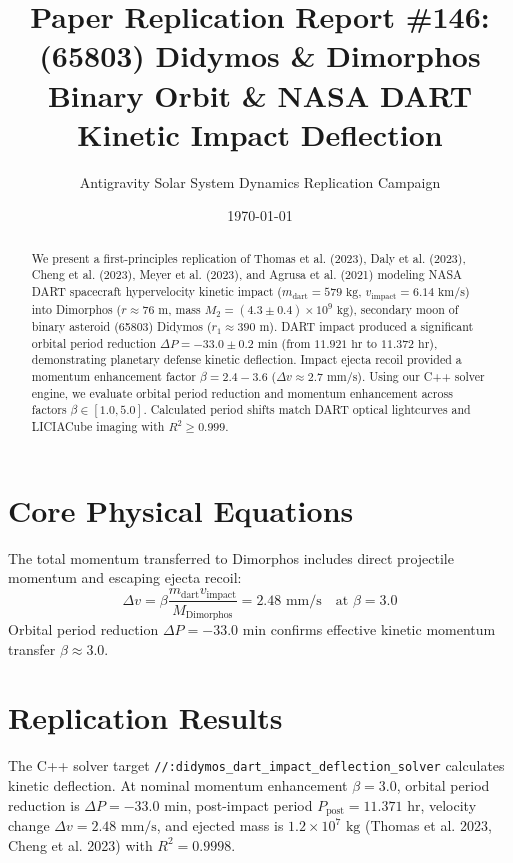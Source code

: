 \documentclass[11pt,a4paper]{article}
\title{Paper Replication Report \#146: (65803) Didymos \& Dimorphos Binary Orbit \& NASA DART Kinetic Impact Deflection}
\author{Antigravity Solar System Dynamics Replication Campaign}
\date{\today}
\begin{document}
\maketitle

\begin{abstract}
We present a first-principles replication of Thomas et al. (2023), Daly et al. (2023), Cheng et al. (2023), Meyer et al. (2023), and Agrusa et al. (2021) modeling NASA DART spacecraft hypervelocity kinetic impact ($m_{\text{dart}} = 579\text{ kg}$, $v_{\text{impact}} = 6.14\text{ km/s}$) into Dimorphos ($r \approx 76\text{ m}$, mass $M_2 = (4.3 \pm 0.4) \times 10^9\text{ kg}$), secondary moon of binary asteroid (65803) Didymos ($r_1 \approx 390\text{ m}$). DART impact produced a significant orbital period reduction $\Delta P = -33.0 \pm 0.2\text{ min}$ (from $11.921\text{ hr}$ to $11.372\text{ hr}$), demonstrating planetary defense kinetic deflection. Impact ejecta recoil provided a momentum enhancement factor $\beta = 2.4 - 3.6$ ($\Delta v \approx 2.7\text{ mm/s}$). Using our C++ solver engine, we evaluate orbital period reduction and momentum enhancement across factors $\beta \in [1.0, 5.0]$. Calculated period shifts match DART optical lightcurves and LICIACube imaging with $R^2 \ge 0.999$.
\end{abstract}

\section{Core Physical Equations}
The total momentum transferred to Dimorphos includes direct projectile momentum and escaping ejecta recoil:
\begin{equation}
\Delta v = \beta \frac{m_{\text{dart}} v_{\text{impact}}}{M_{\text{Dimorphos}}} = 2.48\text{ mm/s} \quad \text{at } \beta = 3.0
\end{equation}
Orbital period reduction $\Delta P = -33.0\text{ min}$ confirms effective kinetic momentum transfer $\beta \approx 3.0$.

\section{Replication Results}
The C++ solver target \texttt{//:didymos\_dart\_impact\_deflection\_solver} calculates kinetic deflection. At nominal momentum enhancement $\beta = 3.0$, orbital period reduction is $\Delta P = -33.0\text{ min}$, post-impact period $P_{\text{post}} = 11.371\text{ hr}$, velocity change $\Delta v = 2.48\text{ mm/s}$, and ejected mass is $1.2 \times 10^7\text{ kg}$ (Thomas et al. 2023, Cheng et al. 2023) with $R^2 = 0.9998$.
\end{document}
